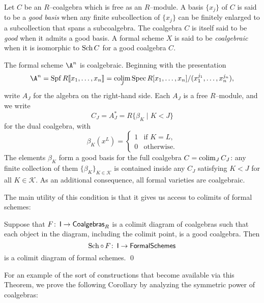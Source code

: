 \begin{definition}\label{DefnCoalgebraicFormalScheme}
Let $C$ be an $R$--coalgebra which is free as an $R$--module.  A basis $\{x_j\}$ of $C$ is said to be a \textit{good basis} when any finite subcollection of $\{x_j\}$ can be finitely enlarged to a subcollection that spans a subcoalgebra.  The coalgebra $C$ is itself said to be \textit{good} when it admits a good basis.  A formal scheme $X$ is said to be \textit{coalgebraic} when it is isomorphic to $\operatorname{Sch} C$ for a good coalgebra $C$.
\end{definition}

\begin{example}\label{FVarsAreCoalgebraic}
The formal scheme $\A^n$ is coalgebraic.  Beginning with the presentation \[\A^n = \Spf R\ps{x_1, \ldots, x_n} = \colim_J \Spec R[x_1, \ldots, x_n] / (x_1^{j_1}, \ldots, x_n^{j_n}),\] write $A_J$ for the algebra on the right-hand side.  Each $A_J$ is a free $R$--module, and we write \[C_J = A_J^* = R\{\beta_K \mid K < J\}\] for the dual coalgebra, with \[\beta_K(x^L) = \begin{cases} 1 & \text{if $K = L$}, \\ 0 & \text{otherwise}. \end{cases}\]  The elements $\beta_K$ form a good basis for the full coalgebra $C = \operatorname*{colim}_J C_J$: any finite collection of them $\{\beta_K\}_{K \in \mathcal K}$ is contained inside any $C_J$ satisfying $K < J$ for all $K \in \mathcal K$.  As an additional consequence, all formal varieties are coalgebraic.
\end{example}

The main utility of this condition is that it gives us access to colimits of formal schemes:

\begin{theorem}\label{CoalgebraicColimitsExist}
Suppose that $F\colon\thinspace \mathsf{I} \to \mathsf{Coalgebras}_R$ is a colimit diagram of coalgebras such that each object in the diagram, including the colimit point, is a good coalgebra.  Then \[\operatorname{Sch} \circ \, F\colon\thinspace \mathsf{I} \to \mathsf{FormalSchemes}\] is a colimit diagram of formal schemes. \qed
\end{theorem}

\noindent For an example of the sort of constructions that become available via this Theorem, we prove the following Corollary by analyzing the symmetric power of coalgebras:

